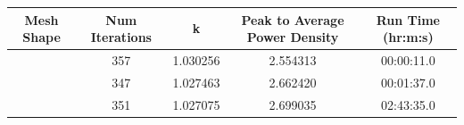 \begin{tabular}{|c|c|c|c|c|}
\hline
Mesh Shape & Num Iterations & k & Peak to Average Power Density & Run Time (hr:m:s) \\ \hline
\hline
[9, 9, 19] & 357 & 1.030256 & 2.554313 & 00:00:11.0 \\ \hline
[18, 18, 19] & 347 & 1.027463 & 2.662420 & 00:01:37.0 \\ \hline
[36, 36, 38] & 351 & 1.027075 & 2.699035 & 02:43:35.0 \\ \hline
\hline
\end{tabular}
